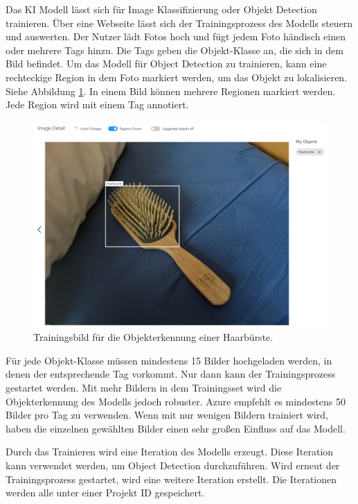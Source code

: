 Das KI Modell lässt sich für Image Klassifizierung oder Objekt Detection trainieren. Über eine Webseite lässt sich der Trainingsprozess des Modells steuern und auswerten. Der Nutzer lädt Fotos hoch und fügt jedem Foto händisch einen oder mehrere Tags hinzu. Die Tags geben die Objekt-Klasse an, die sich in dem Bild befindet. Um das Modell für Object Detection zu trainieren, kann eine rechteckige Region in dem Foto markiert werden, um das Objekt zu lokalisieren. Siehe Abbildung \ref{img:trainingone}. In einem Bild können mehrere Regionen markiert werden. Jede Region wird mit einem Tag annotiert.

\begin{figure}[H]
	\centering
	\includegraphics[width=1\textwidth]{images/trainingone.png}
	\caption[]{Trainingsbild für die Objekterkennung einer Haarbürste.}
	\label{img:trainingone}
\end{figure}

Für jede Objekt-Klasse müssen mindestens 15 Bilder hochgeladen werden, in denen der entsprechende Tag vorkommt. Nur dann kann der Trainingsprozess gestartet werden. Mit mehr Bildern in dem Trainingsset wird die Objekterkennung des Modells jedoch robuster. Azure empfehlt es mindestens 50 Bilder pro Tag zu verwenden. Wenn mit nur wenigen Bildern trainiert wird, haben die einzelnen gewählten Bilder einen sehr großen Einfluss auf das Modell.

Durch das Trainieren wird eine Iteration des Modells erzeugt. Diese Iteration kann verwendet werden, um Object Detection durchzuführen. Wird erneut der Trainingsprozess gestartet, wird eine weitere Iteration erstellt. Die Iterationen werden alle unter einer Projekt ID gespeichert.

